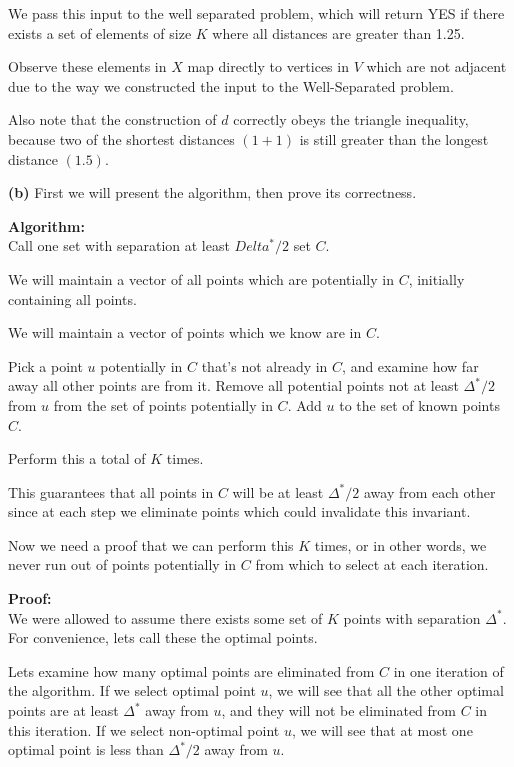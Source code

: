 \documentclass[11pt]{article}
\renewcommand{\part}[1] {\vspace{.10in} {\bf (#1)}}
\begin{document}
We pass this input to the well separated problem, which will return YES
if there exists a set of elements of size $K$ where all distances are greater than 1.25.

Observe these elements in $X$ map directly to vertices in $V$ which are not adjacent
due to the way we constructed the input to the Well-Separated problem.

Also note that the construction of $d$ correctly obeys the triangle inequality, because
two of the shortest distances $(1 + 1)$ is still greater than the longest distance $(1.5)$.


\part{b}
First we will present the algorithm, then prove its correctness.

\textbf{Algorithm:}\\
Call one set with separation at least $Delta^{*} / 2$ set $C$.

We will maintain a vector of all points which are potentially in $C$, initially containing all points.

We will maintain a vector of points which we know are in $C$.

Pick a point $u$ potentially in $C$ that's not already in $C$, and examine how far away all other points are from it.
Remove all potential points not at least $\Delta^{*} / 2$ from $u$ from the set of points potentially in $C$.
Add $u$ to the set of known points $C$.

Perform this a total of $K$ times.

This guarantees that all points in $C$ will be at least $\Delta^{*} / 2$ away from each other since at each step we eliminate points which could invalidate this invariant.

Now we need a proof that we can perform this $K$ times, or in other words, we never run out of points potentially in $C$ from which to select at each iteration.

\textbf{Proof:}\\
We were allowed to assume there exists some set of $K$ points with separation $\Delta^{*}$.
For convenience, lets call these the optimal points.

Lets examine how many optimal points are eliminated from $C$ in one iteration of the algorithm.
If we select optimal point $u$, we will see that all the other optimal points are at least $\Delta^{*}$ away from $u$, and they will not be eliminated from $C$ in this iteration.
If we select non-optimal point $u$, we will see that at most one optimal point is less than $\Delta^{*} / 2$ away from $u$.
\end{document}
